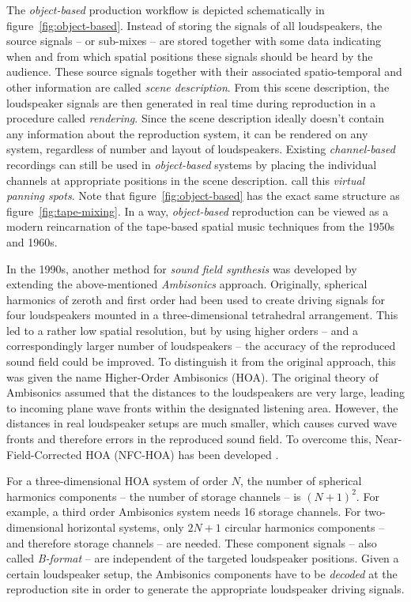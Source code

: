 The \emph{object-based} production workflow is depicted schematically
in figure~\ref{fig:object-based}.
Instead of storing the signals of all loudspeakers,
the source signals -- or sub-mixes -- are stored
together with some data indicating when and from which spatial positions
these signals should be heard by the audience.
These source signals together with their associated spatio-temporal
and other information
are called \emph{scene description}.
From this scene description,
the loudspeaker signals are then generated in real time
during reproduction in a procedure called \emph{rendering}.
Since the scene description ideally doesn't contain any information about the
reproduction system,
it can be rendered on any system,
regardless of number and layout of loudspeakers.
Existing \emph{channel-based} recordings can still be used
in \emph{object-based} systems by placing the individual channels
at appropriate positions in the scene description.
\Textcite{theile2003potential} call this
\emph{virtual panning spots}.
Note that figure~\ref{fig:object-based} has the exact same structure as
figure~\ref{fig:tape-mixing}.
In a way, \emph{object-based} reproduction can be viewed
as a modern reincarnation
of the tape-based spatial music techniques from the 1950s and 1960s.

In the 1990s,
another method for \emph{sound field synthesis} was developed
by extending the above-mentioned \emph{Ambisonics} approach.
Originally, spherical harmonics of zeroth and first order
had been used to create driving signals for four loudspeakers
mounted in a three-dimensional tetrahedral arrangement.
This led to a rather low spatial resolution,
but by using higher orders
-- and a correspondingly larger number of loudspeakers --
the accuracy of the reproduced sound field could be improved.
To distinguish it from the original approach,
this was given the name Higher-Order Ambisonics (HOA).
The original theory of Ambisonics assumed that
the distances to the loudspeakers
are very large, leading to incoming plane wave fronts
within the designated listening area.
However, the distances in real loudspeaker setups are much smaller,
which causes curved wave fronts and therefore errors in the reproduced
sound field.
To overcome this,
Near-Field-Corrected HOA (NFC-HOA) has been developed
\parencite{daniel2000representation,daniel2003spatial}.

For a three-dimensional HOA system of order $N$,
the number of spherical harmonics components
-- \ie the number of storage channels --
is $(N+1)^2$.
For example, a third order Ambisonics system needs \qty{16}{} storage channels.
For two-dimensional horizontal systems,
only $2N+1$ circular harmonics components
-- and therefore storage channels -- are needed.
These component signals
-- also called \emph{B-format} --
are independent of the targeted loudspeaker positions.
Given a certain loudspeaker setup,
the Ambisonics components have to be \emph{decoded} at the reproduction site
in order to generate the appropriate loudspeaker driving signals.

